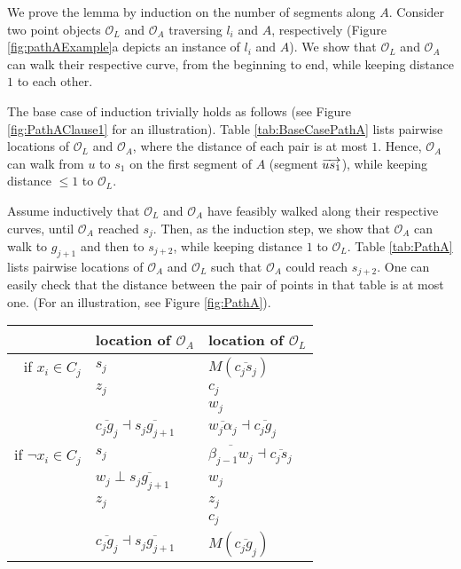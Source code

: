 \documentclass[12pt]{dalthesis}
\def\favoritefont{\bfseries \sffamily}
\def\QED{\ensuremath{{\Box}}}
\def\markatright#1{\leavevmode\unskip\nobreak\quad\hspace*{\fill}{#1}}
\newenvironment{proof}
	{\begin{trivlist}\item[\hskip\labelsep{\favoritefont Proof:}]}
	{\markatright{\QED}\end{trivlist}}
\newcommand{\CO}{{\mathscr O}}
\newcommand{\Seg}[1]{{\overline{#1}}}
\newcommand{\cfev}{{l}}
\begin{document}
\begin{proof}

We prove the lemma by induction on the number of segments along $A$. 
Consider two point objects $\CO_L$ and $\CO_A$ 
traversing $\cfev_i$ and $A$, respectively (Figure \ref{fig:pathAExample}a depicts an instance of $\cfev_i$ and $A$).
We show that $\CO_L$ and $\CO_A$ can walk
their respective curve, from the beginning to
 end, while keeping distance $1$ to each other. 

The base case of induction trivially holds as follows 
(see Figure \ref{fig:PathAClause1} for an illustration).
Table \ref{tab:BaseCasePathA} lists  pairwise locations of 
$\CO_L$ and $\CO_A$, where the distance of each pair is at most $1$.
Hence, $\CO_A$ can walk from $u$ to $s_1$ on the 
first segment of $A$ (segment $\overrightarrow{us_1}$), 
while keeping distance $\le 1$ to $\CO_L$.


Assume inductively that $\CO_L$ and $\CO_A$ have feasibly walked along 
their respective curves, until $\CO_A$ reached $s_j$.
Then, as the induction step, 
we 
show that
$\CO_A$ can walk to $g_{j+1}$ and then to $s_{j+2}$, while keeping distance $1$ to $\CO_L$.
Table \ref{tab:PathA} lists pairwise locations
of $\CO_A$ and $\CO_L$ such that $\CO_A$ could reach  $s_{j+2}$.
One can easily check that the distance between the pair of points 
in that table is at most one.
 (For an illustration, see Figure \ref{fig:PathA}). 


\begin{table}[t]
\centering
\begin{tabular}{ r | l | l  }
  & location of $\CO_A$ & location of $\CO_L$  
 \\
\hline
   if $x_i \in C_j$  & $s_j$ & $M(\Seg{c_js_j})$\\
	& $z_j$ & $c_j$\\ 
	&  & $w_j$\\ 

	& $\Seg{c_jg_j} \dashv \Seg{s_jg_{j+1}} $ & $\Seg{w_{j}\alpha_{j}} \dashv \Seg{c_{j}g_{j}}$ \\





   if $\neg x_i \in C_j$  & $s_j$ & $\Seg{\beta_{j-1}w_j}	\dashv \Seg{c_js_j}$ \\
	& $w_j \perp \Seg{s_jg_{j+1}}$ &$w_j$\\
	& $z_j$ &$z_j$\\
	& &$c_j$\\
	& $\Seg{c_jg_j} \dashv \Seg{s_jg_{j+1}} $ &$ M(\Seg{c_jg_j}) $\\





\end{tabular}
\end{table}
\end{proof}
\end{document}
